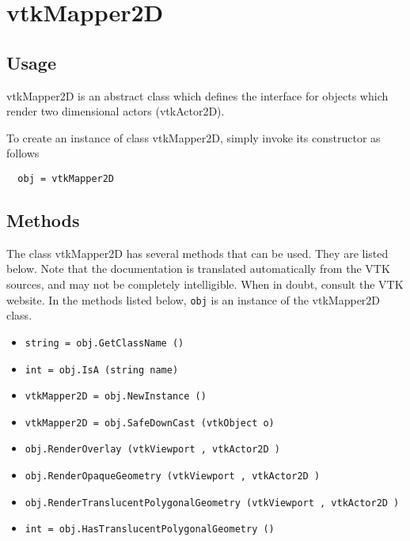 \section{vtkMapper2D}

\subsection{Usage}

 vtkMapper2D is an abstract class which defines the interface for objects
 which render two dimensional actors (vtkActor2D).

To create an instance of class vtkMapper2D, simply
invoke its constructor as follows
\begin{verbatim}
  obj = vtkMapper2D
\end{verbatim}
\subsection{Methods}

The class vtkMapper2D has several methods that can be used.
  They are listed below.
Note that the documentation is translated automatically from the VTK sources,
and may not be completely intelligible.  When in doubt, consult the VTK website.
In the methods listed below, \verb|obj| is an instance of the vtkMapper2D class.
\begin{itemize}
\item  \verb|string = obj.GetClassName ()|

\item  \verb|int = obj.IsA (string name)|

\item  \verb|vtkMapper2D = obj.NewInstance ()|

\item  \verb|vtkMapper2D = obj.SafeDownCast (vtkObject o)|

\item  \verb|obj.RenderOverlay (vtkViewport , vtkActor2D )|

\item  \verb|obj.RenderOpaqueGeometry (vtkViewport , vtkActor2D )|

\item  \verb|obj.RenderTranslucentPolygonalGeometry (vtkViewport , vtkActor2D )|

\item  \verb|int = obj.HasTranslucentPolygonalGeometry ()|

\end{itemize}
